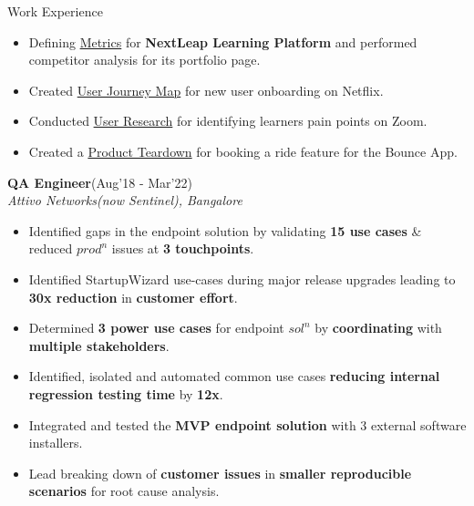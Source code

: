 \begin{rSection}{Work Experience}
\begin{itemize}[leftmargin=*]
	\item Defining \href{https://drive.google.com/file/d/1-avX66iiwxiya52PV7Py78P-dR9KBc26/view?usp=sharing}{Metrics} for {\bf NextLeap Learning Platform} and performed competitor analysis for its portfolio page.

	\item Created \href{https://drive.google.com/file/d/1-avX66iiwxiya52PV7Py78P-dR9KBc26/view?usp=sharing}{User Journey Map} for new user onboarding on Netflix.

	\item Conducted \href{https://drive.google.com/file/d/1-avX66iiwxiya52PV7Py78P-dR9KBc26/view?usp=sharing}{User Research} for identifying learners pain points on Zoom.

	\item Created a \href{https://drive.google.com/file/d/1KT8zrRtvo1okBxOsbrlV3yusbd8QLe2w/view?usp=sharing}{Product Teardown}  for booking a ride feature for the Bounce App.

\end{itemize}

\vspace{-.2cm}

\item{\bf {\bf QA Engineer}}\hfill{(Aug'18 - Mar'22)}\\
\emph{Attivo Networks(now Sentinel), Bangalore}\\
[-0.4cm]

\begin{itemize}[leftmargin=*]

	\itemsep \sepval

	\item Identified gaps in the endpoint solution by validating {\bf 15 use cases} \& reduced $prod^{n}$ issues at {\bf 3 touchpoints}.

	\item Identified StartupWizard use-cases during major release upgrades leading to {\bf 30x reduction} in {\bf customer effort}.

	\item Determined {\bf 3 power use cases} for endpoint $sol^{n}$ by {\bf coordinating} with {\bf multiple stakeholders}.

	\item Identified, isolated and automated common use cases {\bf reducing internal regression testing time} by {\bf 12x}.

	\item Integrated and tested the {\bf MVP endpoint solution} with 3 external software installers.

	\item Lead breaking down of {\bf customer issues} in {\bf smaller reproducible scenarios} for root cause analysis.

\end{itemize}

\end{rSection}

